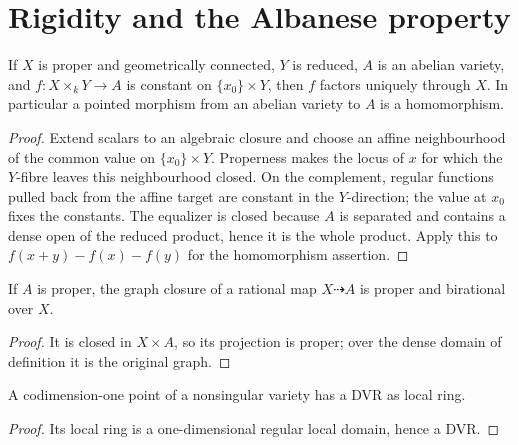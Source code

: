 \chapter{Rigidity and the Albanese property}
\label{pa-ch-albanese}

\begin{theorem}[Rigidity]
  \label{pa-thm-rigidity}
  \cite{milne-av,mumford-av}
  If \(X\) is proper and geometrically connected, \(Y\) is reduced, \(A\) is
  an abelian variety, and \(f:X\times_kY\to A\) is constant on
  \(\{x_0\}\times Y\), then \(f\) factors uniquely through \(X\).  In
  particular a pointed morphism from an abelian variety to \(A\) is a
  homomorphism.
\end{theorem}

\begin{proof}
  Extend scalars to an algebraic closure and choose an affine neighbourhood of
  the common value on \(\{x_0\}\times Y\).  Properness makes the locus of
  \(x\) for which the \(Y\)-fibre leaves this
  neighbourhood closed.  On the complement, regular functions pulled back
  from the affine target are constant in the \(Y\)-direction; the value at
  \(x_0\) fixes the constants.
  The equalizer is closed because \(A\) is separated and contains a dense open
  of the reduced product, hence it is the whole product.  Apply this to
  \(f(x+y)-f(x)-f(y)\) for the homomorphism assertion.
\end{proof}

\begin{lemma}
  \label{pa-lem-rational-graph}
  \cite{milne-av}
  If \(A\) is proper, the graph closure of a rational map \(X\dashrightarrow A\)
  is proper and birational over \(X\).
\end{lemma}

\begin{proof}
  It is closed in \(X\times A\), so its projection is proper; over the dense
  domain of definition it is the original graph.
\end{proof}

\begin{lemma}
  \label{pa-lem-codim-one-dvr}
  \cite{milne-av,hartshorne-ag}
  A codimension-one point of a nonsingular variety has a DVR as local ring.
\end{lemma}

\begin{proof}
  Its local ring is a one-dimensional regular local domain, hence a DVR.
\end{proof}

